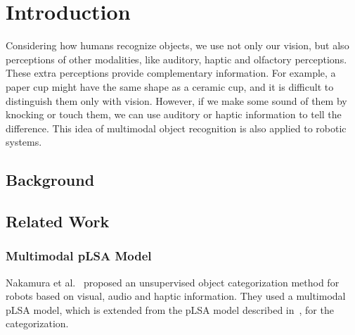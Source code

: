 \documentclass[12pt,final,twoside]{report}
\theoremstyle{plain}
\theoremstyle{definition}
\theoremstyle{remark}
\begin{document}

\chapter{Introduction}
Considering how humans recognize objects, we use not only our vision, but also perceptions of other modalities, like auditory, haptic and olfactory perceptions. These extra perceptions provide complementary information. For example, a paper cup might have the same shape as a ceramic cup, and it is difficult to distinguish them only with vision. However, if we make some sound of them by knocking or touch them, we can use auditory or haptic information to tell the difference. This idea of multimodal object recognition is also applied to robotic systems.

\section{Background}

\section{Related Work}

\subsection{Multimodal pLSA Model}
Nakamura et al.~\cite{nakamura_multimodal_2007} proposed an unsupervised object categorization method for robots based on visual, audio and haptic information. They used a multimodal pLSA model, which is extended from the pLSA model described in~\cite{sivic_discovering_2005}, for the categorization.
\end{document}
